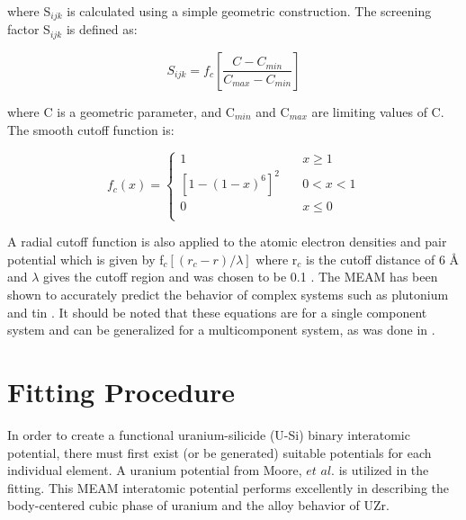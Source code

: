\documentclass[review]{elsarticle}
\providecommand{\DIFaddtex}[1]{{\protect\color{blue}\uwave{#1}}} %
\providecommand{\DIFaddbegin}{} %
\providecommand{\DIFaddend}{} %
\providecommand{\DIFadd}[1]{\texorpdfstring{\DIFaddtex{#1}}{#1}} %
\newcommand{\DIFaddincludegraphics}[2][]{{\color{blue}\fbox{\DIFOincludegraphics[#1]{#2}}}} %
\DeclareRobustCommand{\DIFaddbegin}{\DIFOaddbegin \let\includegraphics\DIFaddincludegraphics} %
\DeclareRobustCommand{\DIFaddend}{\DIFOaddend \let\includegraphics\DIFOincludegraphics} %
\begin{document}
where S$_{ijk}$ is calculated using a simple geometric construction.  The screening factor S$_{ijk}$ is defined as:

\begin{equation}
\label{eq:eqn15}
S_{ijk}= f_{c}\left[\frac{C-C_{min}}{C_{max}-C_{min}}\right]
\end{equation}

where C is a geometric parameter, and C$_{min}$ and C$_{max}$ are limiting values of C.  The smooth cutoff function is:

\begin{equation}
\label{eq:eqn16}
f_{c}(x) = \begin{cases}
    1       & \quad x \geq 1 \\
    [1-(1-x)^{6}]^{2}  & \quad 0 < x < 1\\
    0       & \quad x \leq 0\\
  \end{cases} 
\end{equation}

A radial cutoff function is also applied to the atomic electron densities and pair potential which is given by f$_{c}[(r_{c}-r)/\lambda]$ where r$_{c}$ is the cutoff distance of 6 {\AA } and $\lambda$ gives the cutoff region and was chosen to be 0.1 \DIFaddbegin {\DIFadd{\AA}}\DIFaddend .  The MEAM has been shown to accurately predict the behavior of complex systems such as plutonium \cite{baskes2000} and tin \cite{baskes1997}.  It should be noted that these equations are for a single component system and can be generalized for a multicomponent system, as was done in \cite{baskes2014}.  

\section{Fitting Procedure}
In order to create a functional uranium-silicide (U-Si) binary interatomic potential, there must first exist (or be generated) suitable potentials for each individual element.  A uranium potential from Moore, $\textit{et al.}$ \cite{moore2015} is utilized in the fitting.  This MEAM interatomic potential performs excellently in describing the body-centered cubic phase of uranium and the alloy behavior of UZr.   
\DIFaddbegin 
\end{document}
